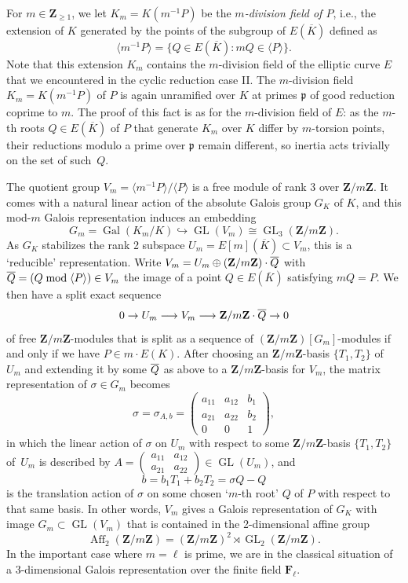 \documentclass{amsart}
\theoremstyle{plain}
\theoremstyle{definition}
\DeclareMathOperator{\Aff}{Aff}
\DeclareMathOperator{\GL}{GL}
\DeclareMathOperator{\Gal}{Gal}
\newcommand{\FF}{{\mathbf{F}}}
\newcommand{\Zee}{{\mathbf{Z}}}
\newcommand{\gothp}{{\mathfrak{p}}}
\newcommand{\tto}{\longrightarrow}
\newcommand{\iso}{\cong}
\newcommand{\mybar}[1]{
  \mathchoice
  {#1\llap{$\overline{\phantom{\displaystyle\rm#1}}$}}
  {#1\llap{$\overline{\phantom{\textstyle\rm#1}}$}}
  {#1\llap{$\overline{\phantom{\scriptstyle\rm#1}}$}}
  {#1\llap{$\overline{\phantom{\scriptscriptstyle\rm#1}}$}}
}
\renewcommand{\bar}{\mybar}
\begin{document}
For $m\in\Zee_{\ge1}$, we let $K_m=K(m^{-1}P)$ be the 
\emph{$m$-division field  of $P$}, i.e., the extension of $K$ 
generated by the points of the subgroup
of $E(\overline K)$ defined as
\[
\langle m^{-1} P\rangle = 
\{Q\in E(\overline K): mQ \in \langle P\rangle\}.
\]
Note that this extension $K_m$ contains the $m$-division field of the elliptic curve $E$
that we encountered in the cyclic reduction case II.
The $m$-division field $K_m=K(m^{-1}P)$ of $P$ is again unramified over $K$ 
at primes $\gothp$ of good reduction coprime to $m$. 
The proof of this fact is as for the $m$-division field of $E$: 
as the $m$-th roots $Q\in E(\overline K)$ of $P$ that generate $K_m$ over $K$ 
differ by $m$-torsion points,
their reductions modulo a prime over $\gothp$ remain different, 
so inertia acts trivially on the set of such~$Q$.

The quotient group 
$V_m=\langle m^{-1} P\rangle / \langle P\rangle$
is a free module of rank 3 over $\Zee/m\Zee$.
It comes with a natural linear action of the absolute Galois group $G_K$ of $K$, and this 
mod-$m$ Galois representation induces an embedding
\begin{equation}
\label{mod-ell-rep}
G_m=\Gal(K_m/K)\hookrightarrow \GL(V_m)\iso \GL_3(\Zee/m\Zee).
\end{equation}
As $G_K$ stabilizes the rank 2 subspace 
$U_m=E[m](\overline K)\subset V_m$, this is a `reducible' representation.
Write $V_m=U_m\oplus (\Zee/m\Zee)\cdot \bar Q$ with $\bar Q = (Q\bmod \langle P\rangle) \in V_m$
the image of a point $Q\in E(\overline K)$ satisfying $m Q=P$.
We then have a split exact sequence 
\[
0\to U_m \tto  V_m \tto \Zee/m\Zee\cdot \bar Q \to 0
\]
of free $\Zee/m\Zee$-modules that is split as a sequence of 
$(\Zee/m\Zee)[G_m]$-modules if and only if we have
$P\in m \cdot E(K)$.
After choosing an $\Zee/m\Zee$-basis $\{T_1, T_2\}$ of $U_m$ 
and extending it by some $\bar Q$ as above to a 
$\Zee/m\Zee$-basis for $V_m$,
the matrix representation of $\sigma\in G_m$ becomes
\begin{equation}
\label{matrixrep}
\sigma=\sigma_{A,b}=
\begin{pmatrix}
a_{11} & a_{12} & b_1 \\
a_{21} & a_{22} & b_2 \\
0 & 0 & 1 
\end{pmatrix},
\end{equation}
in which 
the linear action of $\sigma$ on $U_m$ with respect to 
some $\Zee/m\Zee$-basis $\{T_1, T_2\}$ of~$U_m$
is described by
$A=\begin{pmatrix}
a_{11} & a_{12}  \\
a_{21} & a_{22}  
\end{pmatrix}
\in \GL(U_m)$,
and 
\[
b=b_1T_1+b_2T_2=\sigma Q - Q
\]
is the translation action of $\sigma$ on some chosen `$m$-th root' 
$Q$ of $P$ with respect to that same basis.
In other words, $V_m$ gives a Galois representation of $G_K$ with image $G_m\subset \GL(V_m)$
that is contained in the 2-dimensional
affine group
\[
\Aff_2(\Zee/m\Zee)=(\Zee/m\Zee)^2 \rtimes \GL_2(\Zee/m\Zee).
\]
In the important case where $m=\ell$ is prime, we are in the classical situation
of a 3-dimensional Galois representation over the finite field $\FF_\ell$.
\end{document}
